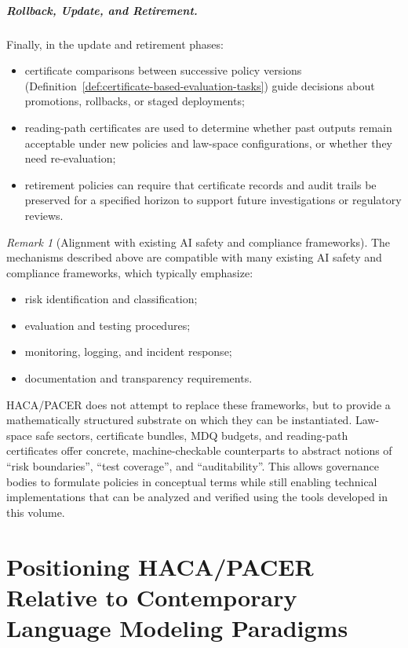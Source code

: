\documentclass[11pt]{book}
\theoremstyle{plain}
\theoremstyle{definition}
\theoremstyle{remark}
\newtheorem{remark}[theorem]{Remark}
\begin{document}
\subparagraph{Rollback, Update, and Retirement.}
Finally, in the update and retirement phases:
\begin{itemize}
  \item certificate comparisons between successive policy versions
        (Definition~\ref{def:certificate-based-evaluation-tasks}) guide
        decisions about promotions, rollbacks, or staged deployments;
  \item reading-path certificates are used to determine whether past
        outputs remain acceptable under new policies and law-space
        configurations, or whether they need re-evaluation;
  \item retirement policies can require that certificate records and
        audit trails be preserved for a specified horizon to support
        future investigations or regulatory reviews.
\end{itemize}

\begin{remark}[Alignment with existing AI safety and compliance frameworks]
\label{rem:alignment-ai-safety-frameworks}
The mechanisms described above are compatible with many existing AI
safety and compliance frameworks, which typically emphasize:
\begin{itemize}
  \item risk identification and classification;
  \item evaluation and testing procedures;
  \item monitoring, logging, and incident response;
  \item documentation and transparency requirements.
\end{itemize}
HACA/PACER does not attempt to replace these frameworks, but to
provide a mathematically structured substrate on which they can be
instantiated. Law-space safe sectors, certificate bundles, MDQ budgets,
and reading-path certificates offer concrete, machine-checkable
counterparts to abstract notions of ``risk boundaries'', ``test
coverage'', and ``auditability''. This allows governance bodies to
formulate policies in conceptual terms while still enabling technical
implementations that can be analyzed and verified using the tools
developed in this volume.
\end{remark}



\section[Positioning HACA/PACER vs Neural LM Paradigms]{Positioning HACA/PACER Relative to Contemporary \\Language Modeling Paradigms}
\label{sec:haca-positioning-lm}
\end{document}
